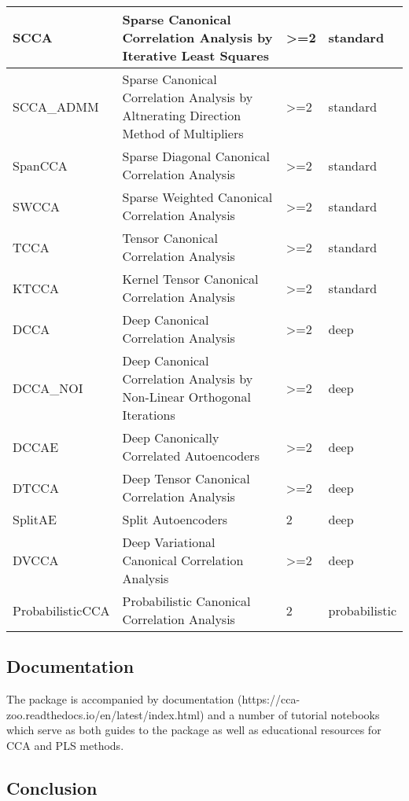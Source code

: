 \begin{center}
\begin{tabular}{|| p{}|p{}|p{}|p{} ||}
    \hline
    SCCA & Sparse Canonical Correlation Analysis by Iterative Least Squares \cite{mai2019iterative} & >=2 & standard\\
    \hline
    SCCA\_ADMM & Sparse Canonical Correlation Analysis by Altnerating Direction Method of Multipliers \cite{suo2017sparse} & >=2 & standard\\
    \hline
    SpanCCA & Sparse Diagonal Canonical Correlation Analysis \cite{asteris2016simple} & >=2 & standard\\
    \hline
    SWCCA & Sparse Weighted Canonical Correlation Analysis \cite{wenwen2018sparse} & >=2 & standard\\
    \hline
    TCCA & Tensor Canonical Correlation Analysis & >=2 & standard\\
    \hline
    KTCCA & Kernel Tensor Canonical Correlation Analysis \cite{kim2007tensor} & >=2 & standard\\
    \hline
    DCCA & Deep Canonical Correlation Analysis & >=2 & deep\\
    \hline
    DCCA\_NOI & Deep Canonical Correlation Analysis by Non-Linear Orthogonal Iterations \cite{wang2015stochastic} & >=2 & deep\\
    \hline
    DCCAE & Deep Canonically Correlated Autoencoders \cite{wang2015deep} & >=2 & deep\\
    \hline
    DTCCA & Deep Tensor Canonical Correlation Analysis & >=2 & deep\\
    \hline
    SplitAE & Split Autoencoders \cite{ngiam2011multimodal} & 2 & deep\\
    \hline
    DVCCA & Deep Variational Canonical Correlation Analysis & >=2 & deep\\
    \hline
    ProbabilisticCCA & Probabilistic Canonical Correlation Analysis & 2 & probabilistic\\
    \hline
\end{tabular}
\end{center}


\subsection{Documentation}

The package is accompanied by documentation (https://cca-zoo.readthedocs.io/en/latest/index.html) and a number of tutorial notebooks which serve as both guides to the package as well as educational resources for CCA and PLS methods.

\subsection{Conclusion}

